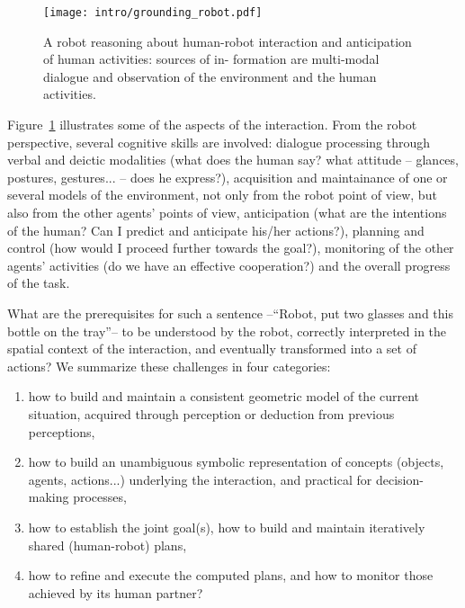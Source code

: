 \begin{figure}
    \centering
    \texttt{[image: intro/grounding\_robot.pdf]}
    \caption{A robot reasoning about human-robot interaction and anticipation
    of human activities: sources of in- formation are multi-modal dialogue and
    observation of the environment and the human activities.}
    \label{fig|hri-dec}
\end{figure}


Figure~\ref{fig|hri-dec} illustrates some of the aspects of the interaction.
From the robot perspective, several cognitive skills are involved: dialogue
processing through verbal and deictic modalities (what does the human say? what
attitude -- glances, postures, gestures... -- does he express?), acquisition
and maintainance of one or several models of the environment, not only from the
robot point of view, but also from the other agents' points of view,
anticipation (what are the intentions of the human? Can I predict and
anticipate his/her actions?), planning and control (how would I proceed further
towards the goal?), monitoring of the other agents' activities (do we have an
effective cooperation?) and the overall progress of the task. 

What are the prerequisites for such a sentence --``Robot, put two glasses and
this bottle on the tray''-- to be understood by the robot, correctly
interpreted in the spatial context of the interaction, and eventually
transformed into a set of actions? We summarize these challenges in four
categories:

\begin{enumerate}

    \item how to build and maintain a consistent geometric model of the current
    situation, acquired through perception or deduction from previous
    perceptions,

    \item how to build an unambiguous symbolic representation of concepts
    (objects, agents, actions...) underlying the interaction, and practical for
    decision-making processes,

    \item how to establish the joint goal(s), how to build and maintain
    iteratively shared (human-robot) plans, 

    \item how to refine and execute the computed plans, and how to monitor
    those achieved by its human partner?

\end{enumerate}


